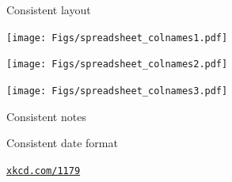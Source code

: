 \documentclass[aspectratio=169,12pt,t]{beamer}
\begin{document}
\begin{frame}{Consistent layout}


\texttt{[image: Figs/spreadsheet\_colnames1.pdf]}

\vspace*{-0.6\textheight}
\hspace*{0.1\textwidth}
\texttt{[image: Figs/spreadsheet\_colnames2.pdf]}

\vspace*{-0.6\textheight}
\hspace*{0.2\textwidth}
\texttt{[image: Figs/spreadsheet\_colnames3.pdf]}

  \note{

  }

\end{frame}



\begin{frame}[c]{Consistent notes}



  \note{

  }

\end{frame}



\begin{frame}[c]{Consistent date format}


  \note{

  }

\end{frame}



\begin{frame}[c]{}

\vspace{24pt}


\vfill

\hfill {\tt \footnotesize \lolit \href{http://xkcd.com/1179/}{xkcd.com/1179}}




\end{frame}
\end{document}
